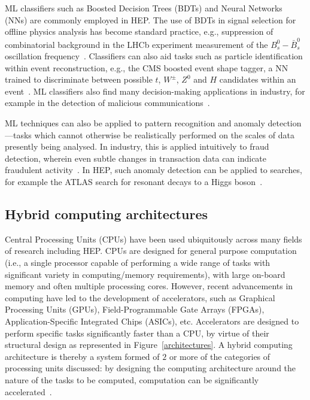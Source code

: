 ML classifiers such as Boosted Decision Trees (BDTs) and Neural Networks (NNs) are commonly employed in HEP. The use of BDTs in signal selection for offline physics analysis has become standard practice, e.g., suppression of combinatorial background in the LHCb experiment measurement of the $B_s^0-\bar{B}_s^0$ oscillation frequency~\cite{delta-ms}. Classifiers can also aid tasks such as particle identification within event reconstruction, e.g., the CMS boosted event shape tagger, a NN trained to discriminate between possible $t$, $W^\pm$, $Z^0$ and $H$ candidates within an event~\cite{CMS-best}. ML classifiers also find many decision-making applications in industry, for example in the detection of malicious communications~\cite{classifier-phishing}.

ML techniques can also be applied to pattern recognition and anomaly detection—tasks which cannot otherwise be realistically performed on the scales of data presently being analysed. In industry, this is applied intuitively to fraud detection, wherein even subtle changes in transaction  data can indicate fraudulent activity~\cite{fraud-detection}. In HEP, such anomaly detection can be applied to searches, for example the ATLAS search for resonant decays to a Higgs boson~\cite{anomaly-hep}.

\subsection{Hybrid computing architectures}
\label{hybrid-architectures}
Central Processing Units (CPUs) have been used ubiquitously across many fields of research including HEP. CPUs are designed for general purpose computation (i.e., a single processor capable of performing a wide range of tasks with significant variety in computing/memory requirements), with large on-board memory and often multiple processing cores. However, recent advancements in computing have led to the development of accelerators, such as Graphical Processing Units (GPUs), Field-Programmable Gate Arrays (FPGAs), Application-Specific Integrated Chips (ASICs), etc. Accelerators are designed to perform specific tasks significantly faster than a CPU, by virtue of their structural design as represented in Figure~\ref{architectures}. A hybrid computing architecture is thereby a system formed of $2$ or more of the categories of processing units discussed: by designing the computing architecture around the nature of the tasks to be computed, computation can be significantly accelerated~\cite{architectures}.

